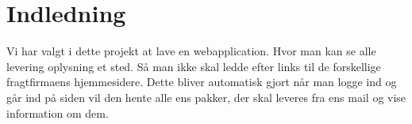 \chapter{Indledning}
Vi har valgt i dette projekt at lave en webapplication.
Hvor man kan se alle levering oplysning et sted. Så man 
ikke skal ledde efter links til de forskellige fragtfirmaens
hjemmesidere. Dette bliver automatisk gjort når man logge ind og
går ind på siden vil den hente alle ens pakker, der skal leveres fra
ens mail og vise information om dem.
